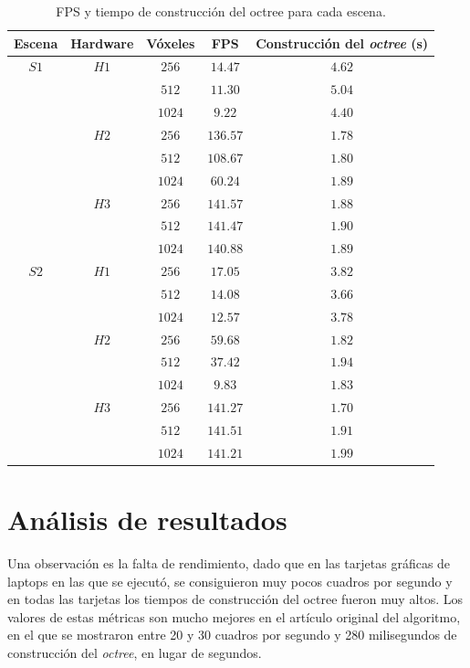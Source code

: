 \begin{table}[ht]
\centering
\begin{tabular}{|c|c|c|c|c|}
	\hline
	\textbf{Escena} & \textbf{Hardware} & \textbf{Vóxeles} & \textbf{FPS} & \textbf{Construcción del \textit{octree} (s)} \\
	\hline
	$S1$ & $H1$ & $256$ & $14.47$ & $4.62$ \\
	\cline{3-5}
	 & & $512$ & $11.30$ & $5.04$ \\
	\cline{3-5}
	 & & $1024$ & $9.22$ & $4.40$ \\
	\cline{2-5}
	 & $H2$ & $256$ & $136.57$ & $1.78$ \\
	\cline{3-5}
	 & & $512$ & $108.67$ & $1.80$ \\
	\cline{3-5}
	 & & $1024$ & $60.24$ & $1.89$ \\
	\cline{2-5}
	 & $H3$ & $256$ & $141.57$ & $1.88$ \\
	\cline{3-5}
	 & & $512$ & $141.47$ & $1.90$ \\
	\cline{3-5}
	 & & $1024$ & $140.88$ & $1.89$ \\
	\hline
	$S2$ & $H1$ & $256$ & $17.05$ & $3.82$ \\
	\cline{3-5}
	 & & $512$ & $14.08$ & $3.66$ \\
	\cline{3-5}
	 & & $1024$ & $12.57$ & $3.78$ \\
	\cline{2-5}
	 & $H2$ & $256$ & $59.68$ & $1.82$ \\
	\cline{3-5}
	 & & $512$ & $37.42$ & $1.94$ \\
	\cline{3-5}
	 & & $1024$ & $9.83$ & $1.83$ \\
	\cline{2-5}
	 & $H3$ & $256$ & $141.27$ & $1.70$ \\
	\cline{3-5}
	 & & $512$ & $141.51$ & $1.91$ \\
	\cline{3-5}
	 & & $1024$ & $141.21$ & $1.99$ \\
	\hline
\end{tabular}
\caption{FPS y tiempo de construcción del octree para cada escena.}
\label{tab:experiment-results}
\end{table}

\section{Análisis de resultados}

Una observación es la falta de rendimiento, dado que en las tarjetas gráficas de laptops en las que se ejecutó, se consiguieron muy pocos cuadros por segundo y en todas las tarjetas los tiempos de construcción del octree fueron muy altos.
Los valores de estas métricas son mucho mejores en el artículo original del algoritmo, en el que se mostraron entre 20 y 30 cuadros por segundo y 280 milisegundos de construcción del \textit{octree}, en lugar de segundos.

